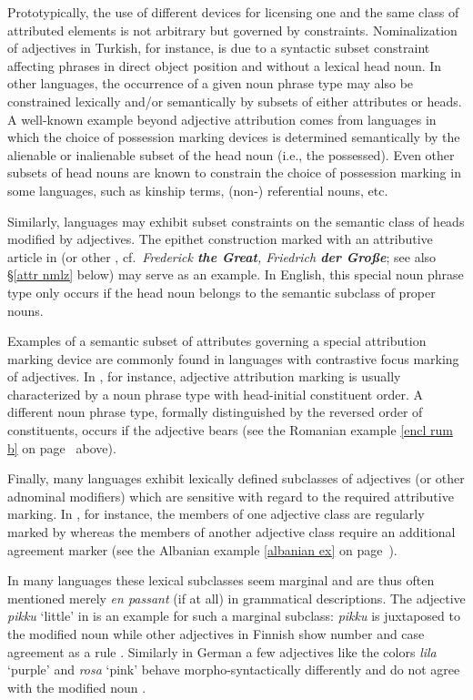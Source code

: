 Prototypically, the use of different devices for licensing one and the same class of attributed elements is not arbitrary but governed by constraints. Nominalization of adjectives in Turkish, for instance, is due to a syntactic subset constraint affecting phrases in direct object position and without a lexical head noun. In other languages, the occurrence of a given noun phrase type may also be constrained lexically and/or semantically by subsets of either attributes or heads. A well-known example beyond adjective attribution comes from languages in which the choice of possession marking devices is determined semantically by the alienable or inalienable subset of the head noun (i.e., the possessed). Even other subsets of head nouns are known to constrain the choice of possession marking in some languages, such as kinship terms, (non-) referential nouns, etc.

Similarly, languages may exhibit subset constraints on the semantic class of heads modified by adjectives. The epithet construction marked with an attributive article in  (or other , cf.~\textit{Frederick \textbf{the Great}, Friedrich \textbf{der Große}}; see also \S\ref{attr nmlz} below) may serve as an example. In English, this special noun phrase type only occurs if the head noun belongs to the semantic subclass of proper nouns.

Examples of a semantic subset of attributes governing a special attribution marking device are commonly found in languages with contrastive focus marking of adjectives. In , for instance, adjective attribution marking is usually characterized by a noun phrase type with head-initial constituent order. A different noun phrase type, formally distinguished by the reversed order of constituents, occurs if the adjective bears  (see the Romanian example \ref{encl rum b} on page~\pageref{encl rum b} above).

Finally, many languages exhibit lexically defined subclasses of adjectives (or other adnominal modifiers) which are sensitive with regard to the required attributive marking. In , for instance, the members of one adjective class are regularly marked by  whereas the members of another adjective class require an additional agreement marker (see the Albanian example \ref{albanian ex} on page~\pageref{albanian synchr}).

In many languages these lexical subclasses seem marginal and are thus often mentioned merely \emph{en passant} (if at all) in grammatical descriptions. The adjective \textit{pikku} ‘little’ in  is an example for such a marginal subclass: \textit{pikku} is juxtaposed to the modified noun while other adjectives in Finnish show number and case agreement as a rule \citep[75]{karlsson1999}. Similarly in German a few adjectives like the colors \textit{lila} ‘purple’ and \textit{rosa} ‘pink’ behave morpho-syntactically differently and do not agree with the modified noun \citep[cf.~also][243]{schafer2015a}.  

